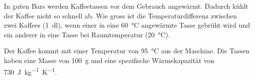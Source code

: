 
\begin{aufgabe}
In guten Bars werden Kaffeetassen vor dem Gebrauch angewärmt. Dadurch kühlt der Kaffee nicht so schnell ab.
Wie gross ist die Temperaturdifferenz zwischen zwei Kaffees (\SI{1}{dl}), wenn einer in eine \SI{60}{\celsius} angewärmte
Tasse gebrüht wird und ein anderer in eine Tasse bei Raumtemperatur (\SI{20}{\celsius}).

Der Kaffee kommt mit einer Temperatur von \SI{95}{\celsius} aus der Maschine.
Die Tassen haben eine Masse von \SI{100}{g} und eine spezifische Wärmekapazität von \SI{730}{J kg^{-1} K^{-1}}.
\end{aufgabe}


